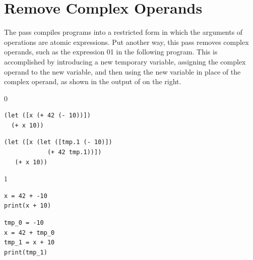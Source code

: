\documentclass[7x10]{TimesAPriori_MIT}%
\def\racketEd{0}
\def\pythonEd{1}
\providecommand{\BookEdition}{1}
\let\edition\BookEdition
\newcommand{\racket}[1]{{\if\edition\racketEd{#1}\fi}}
\newcommand{\pythonColor}[0]{}
\newcommand{\python}[1]{{\if\edition\pythonEd\pythonColor #1\fi}}
\numberwithin{theorem}{chapter}
\numberwithin{definition}{chapter}
\numberwithin{equation}{chapter}
\begin{document}
\section{Remove Complex Operands}
\label{sec:remove-complex-opera-Lvar}

The  pass compiles \LangVar{} programs
into a restricted form in which the arguments of operations are atomic
expressions.  Put another way, this pass removes complex
operands, such as the expression
\racket{}\python{}
in the following program. This is accomplished by introducing a new
temporary variable, assigning the complex operand to the new
variable, and then using the new variable in place of the complex
operand, as shown in the output of  on the
right.
{\if\edition\racketEd
\begin{transformation}
\begin{lstlisting}
(let ([x (+ 42 (- 10))])
  (+ x 10))
\end{lstlisting}
\compilesto
\begin{lstlisting}
(let ([x (let ([tmp.1 (- 10)])
            (+ 42 tmp.1))])
   (+ x 10))
\end{lstlisting}
\end{transformation}
\fi}
{\if\edition\pythonEd\pythonColor
\begin{transformation}  
\begin{lstlisting}
x = 42 + -10
print(x + 10)
\end{lstlisting}
\compilesto
\begin{lstlisting}
tmp_0 = -10
x = 42 + tmp_0
tmp_1 = x + 10
print(tmp_1)
\end{lstlisting}
\end{transformation}
\fi}


\newcommand{\LvarMonadASTRacket}{
\begin{array}{rcl}
\Atm &::=& \INT{\Int} \MID \VAR{\Var} \\
\Exp &::=& \Atm \MID \READ{} \\
     &\MID& \NEG{\Atm} \MID \ADD{\Atm}{\Atm} \MID \SUB{\Atm}{\Atm} \\
     &\MID&  \LET{\Var}{\Exp}{\Exp} \\
\end{array}
}  

\newcommand{\LvarMonadASTPython}{
\begin{array}{rcl}
\Atm &::=& \INT{\Int} \MID \VAR{\Var} \\  
\Exp{} &::=& \Atm \MID \READ{} \\
       &\MID& \UNIOP{\key{USub()}}{\Atm} \MID \BINOP{\Atm}{\key{Add()}}{\Atm}  \\
       &\MID& \BINOP{\Atm}{\key{Sub()}}{\Atm} \\ 
\Stmt{} &::=& \PRINT{\Atm} \MID \EXPR{\Exp} \\
        &\MID& \ASSIGN{\VAR{\Var}}{\Exp}
\end{array}
}
\end{document}
